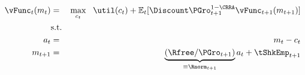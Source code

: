   \begin{eqnarray}
    \null{\vFunc}_{t}({m}_{t}) & = & \max_{{c}_{t}} ~~ \util({c}_{t})+
                                     \Ex_{t}[{\Discount} \PGro_{t+1}^{1-\CRRA}\null{\vFunc}_{t+1}({m}_{t+1})] \label{vtNorm}
    \\         & \text{s.t.} &   \nonumber \\
    {a}_{t}   & = & {m}_{t}-{c}_{t} \nonumber
    \\      {m}_{t+1} & = & \underbrace{\left(\Rfree/\PGro_{t+1}\right)}_{\equiv \Rnorm_{t+1}}{a}_{t}+\tShkEmp_{t+1} \nonumber
  \end{eqnarray}
